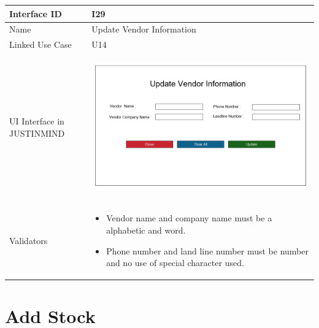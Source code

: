 \documentclass[12pt,a4paper]{report}
\begin{document}
\begin{tabular}{ | m{3cm} | m{12cm}| } \hline

Interface ID & I29  \\\hline

Name  &  Update Vendor Information \\ \hline

Linked Use Case & U14	 \\ \hline

UI Interface in JUSTINMIND & \begin{center} \includegraphics[scale=0.3]{./User Interface/UI-028 Update Vendor Information@1x.png}\end{center}  \\ \hline

Validators & 
\begin{itemize}
\item   Vendor name and company name must be a alphabetic and word.
\item   Phone number and land line number must be number and no use of special character used. 
\end{itemize}
\\ \hline
\end{tabular}
\section{Add Stock}
\end{document}
